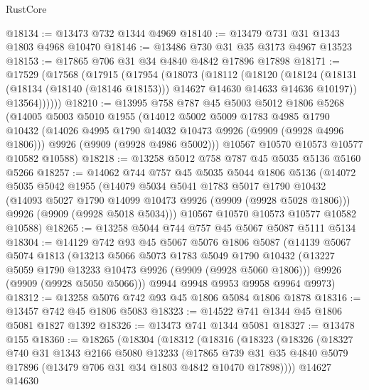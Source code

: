 \begin{lexlean}{RustCore}
\begin{coremodule}
@18134 := @13473 @732 @1344 @4969
@18140 := @13479 @731 @31 @1343 @1803 @4968 @10470
@18146 := @13486 @730 @31 @35 @3173 @4967 @13523
@18153 := @17865 @706 @31 @34 @4840 @4842 @17896 @17898
@18171 := @17529
    (@17568
      (@17915
        (@17954
          (@18073
            (@18112
              (@18120
                (@18124
                  (@18131 (@18134 (@18140 (@18146 @18153))) @14627 @14630 @14633 @14636 @10197))
                @13564))))))
@18210 := @13995
    @758
    @787
    @45
    @5003
    @5012
    @1806
    @5268
    (@14005
      @5003
      @5010
      @1955
      (@14012
        @5002
        @5009
        @1783
        @4985
        @1790
        @10432
        (@14026 @4995 @1790 @14032 @10473 @9926 (@9909 (@9928 @4996 @1806)))
        @9926
        (@9909 (@9928 @4986 @5002)))
      @10567
      @10570
      @10573
      @10577
      @10582
      @10588)
@18218 := @13258 @5012 @758 @787 @45 @5035 @5136 @5160 @5266
@18257 := @14062
    @744
    @757
    @45
    @5035
    @5044
    @1806
    @5136
    (@14072
      @5035
      @5042
      @1955
      (@14079
        @5034
        @5041
        @1783
        @5017
        @1790
        @10432
        (@14093 @5027 @1790 @14099 @10473 @9926 (@9909 (@9928 @5028 @1806)))
        @9926
        (@9909 (@9928 @5018 @5034)))
      @10567
      @10570
      @10573
      @10577
      @10582
      @10588)
@18265 := @13258 @5044 @744 @757 @45 @5067 @5087 @5111 @5134
@18304 := @14129
    @742
    @93
    @45
    @5067
    @5076
    @1806
    @5087
    (@14139
      @5067
      @5074
      @1813
      (@13213
        @5066
        @5073
        @1783
        @5049
        @1790
        @10432
        (@13227 @5059 @1790 @13233 @10473 @9926 (@9909 (@9928 @5060 @1806)))
        @9926
        (@9909 (@9928 @5050 @5066)))
      @9944
      @9948
      @9953
      @9958
      @9964
      @9973)
@18312 := @13258 @5076 @742 @93 @45 @1806 @5084 @1806 @1878
@18316 := @13457 @742 @45 @1806 @5083
@18323 := @14522 @741 @1344 @45 @1806 @5081 @1827 @1392
@18326 := @13473 @741 @1344 @5081
@18327 := @13478 @155
@18360 := @18265
    (@18304
      (@18312
        (@18316
          (@18323
            (@18326
              (@18327
                @740
                @31
                @1343
                @2166
                @5080
                @13233
                (@17865
                  @739
                  @31
                  @35
                  @4840
                  @5079
                  @17896
                  (@13479 @706 @31 @34 @1803 @4842 @10470 @17898))))
            @14627
            @14630

\end{coremodule}
\end{lexlean}
